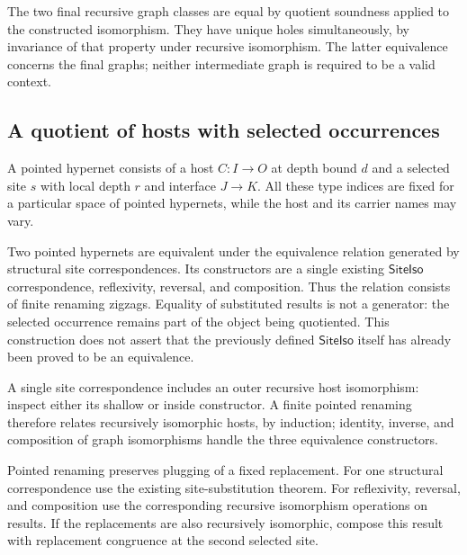 The two final recursive graph classes are equal by quotient soundness
applied to the constructed isomorphism. They have unique holes
simultaneously, by invariance of that property under recursive
isomorphism. The latter equivalence concerns the final graphs; neither
intermediate graph is required to be a valid context.

\subsection{A quotient of hosts with selected occurrences}
\begin{definition}\label{term:pointed-hypernet}
A pointed hypernet consists of a host $C:I\to O$ at depth bound $d$ and
a selected site $s$ with local depth $r$ and interface $J\to K$.
All these type indices are fixed for a particular space of pointed
hypernets, while the host and its carrier names may vary.
\end{definition}

\begin{definition}\label{term:pointed-renaming}
Two pointed hypernets are equivalent under the equivalence relation
generated by structural site correspondences. Its constructors are a
single existing $\mathsf{SiteIso}$ correspondence, reflexivity, reversal,
and composition. Thus the relation consists of finite renaming zigzags.
Equality of substituted results is not a generator: the selected occurrence
remains part of the object being quotiented.
This construction does not assert that the previously defined
$\mathsf{SiteIso}$ itself has already been proved to be an equivalence.
\end{definition}

A single site correspondence includes an outer recursive host isomorphism:
inspect either its shallow or inside constructor. A finite pointed
renaming therefore relates recursively isomorphic hosts, by induction;
identity, inverse, and composition of graph isomorphisms handle the
three equivalence constructors.

Pointed renaming preserves plugging of a fixed replacement. For one
structural correspondence use the existing site-substitution theorem.
For reflexivity, reversal, and composition use the corresponding
recursive isomorphism operations on results. If the replacements are
also recursively isomorphic, compose this result with replacement
congruence at the second selected site.

